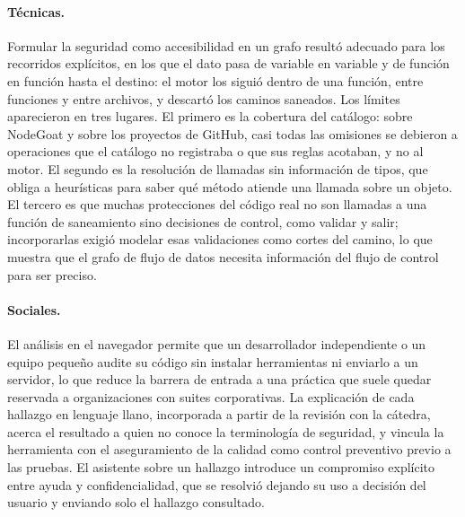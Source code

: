 \paragraph{Técnicas.} Formular la seguridad como accesibilidad en un
grafo resultó adecuado para los recorridos explícitos, en los que el dato
pasa de variable en variable y de función en función hasta el destino:
el motor los siguió dentro de una función, entre funciones y entre
archivos, y descartó los caminos saneados. Los límites aparecieron en
tres lugares. El primero es la cobertura del catálogo: sobre NodeGoat y
sobre los proyectos de GitHub, casi todas las omisiones se debieron a
operaciones que el catálogo no registraba o que sus reglas acotaban, y
no al motor. El segundo es la resolución de llamadas sin información de
tipos, que obliga a heurísticas para saber qué método atiende una
llamada sobre un objeto. El tercero es que muchas protecciones del código
real no son llamadas a una función de saneamiento sino decisiones de
control, como validar y salir; incorporarlas exigió modelar esas
validaciones como cortes del camino, lo que muestra que el grafo de flujo
de datos necesita información del flujo de control para ser preciso.

\paragraph{Sociales.} El análisis en el navegador permite que un
desarrollador independiente o un equipo pequeño audite su código sin
instalar herramientas ni enviarlo a un servidor, lo que reduce la barrera
de entrada a una práctica que suele quedar reservada a organizaciones con
suites corporativas. La explicación de cada hallazgo en lenguaje llano,
incorporada a partir de la revisión con la cátedra, acerca el resultado a
quien no conoce la terminología de seguridad, y vincula la herramienta
con el aseguramiento de la calidad como control preventivo previo a las
pruebas. El asistente sobre un hallazgo introduce un compromiso explícito
entre ayuda y confidencialidad, que se resolvió dejando su uso a decisión
del usuario y enviando solo el hallazgo consultado.

